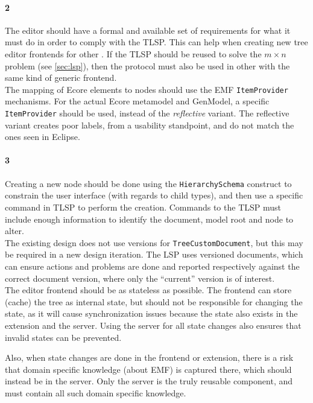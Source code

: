 \paragraph{2} The editor should have a formal and available set of requirements for what it must do in order to comply with the \acrshort{TLSP}.
This can help when creating new tree editor frontends for other .
If the \acrshort{TLSP} should be reused to solve the \(m \times n\) problem (see \cref{sec:lsp}), then the protocol must also be used in other  with the same kind of generic frontend.\\

The mapping of \gls{Ecore} elements to nodes should use the \acrshort{EMF} \texttt{ItemProvider} mechanisms.
For the actual \gls{Ecore} metamodel and GenModel, a specific \texttt{ItemProvider} should be used, instead of the \textit{reflective} variant.
The reflective variant creates poor labels, from a usability standpoint, and do not match the ones seen in \gls{Eclipse}.


\paragraph{3} Creating a new node should be done using the \texttt{HierarchySchema} construct to constrain the user interface (with regards to child types), and then use a specific command in \acrshort{TLSP} to perform the creation.
Commands to the \acrshort{TLSP} must include enough information to identify the document, model root and node to alter.\\

The existing design does not use versions for \texttt{TreeCustomDocument}, but this may be required in a new design iteration.
The \acrshort{LSP} uses versioned documents, which can ensure actions and problems are done and reported respectively against the correct document version, where only the ``current'' version is of interest.\\

The editor frontend should be as stateless as possible.
The frontend can store (cache) the tree as internal state, but should not be responsible for changing the state, as it will cause synchronization issues because the state also exists in the extension and the server.
Using the server for all state changes also ensures that invalid states can be prevented.

Also, when state changes are done in the frontend or extension, there is a risk that domain specific knowledge (about \acrshort{EMF}) is captured there, which should instead be in the server.
Only the server is the truly reusable component, and must contain all such domain specific knowledge.


